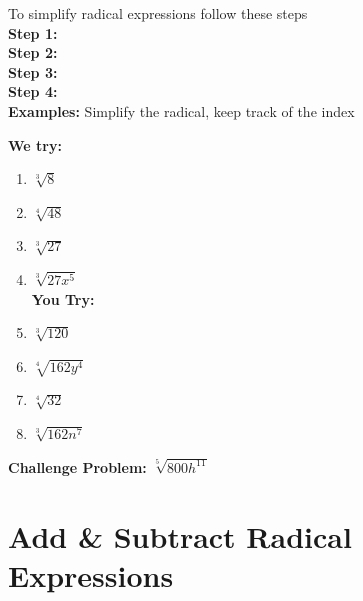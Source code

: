 \documentclass[12pt]{article}
\begin{document}
To simplify radical expressions follow these steps\\

\textbf{Step 1:} \\

\textbf{Step 2:} \\

\textbf{Step 3:} \\

\textbf{Step 4:} \\

\textbf{Examples:} Simplify the radical, keep track of the index\\

\begin{multicols}{2}
\textbf{We try:}\\

\begin{enumerate}
	\setlength\itemsep{1cm}

	\item $\sqrt[3]{8}$\\
	
	
	\item $\sqrt[4]{48}$\\
	
	
	\item $\sqrt[3]{27}$\\
	
	
	\item $\sqrt[3]{27x^5}$\\
	
		
\textbf{You Try:}\\
	
	\item  $\sqrt[3]{120}$ \\
	
	
	\item $\sqrt[4]{162y^4}$\\
	
	
	\item $\sqrt[4]{32}$\\
	
	
	\item $\sqrt[3]{162n^7}$\\
	
	

\end{enumerate}
\end{multicols}

 \textbf{Challenge Problem:} $\sqrt[5]{800h^{11}}$

\section{Add \& Subtract Radical Expressions}
\end{document}
